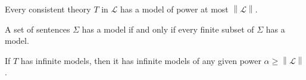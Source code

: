 \documentclass[../../main.tex]{subfiles}
\begin{document}
\begin{theorem}\label{down-lowenheim-skolem}\cite[Corollary 2.1.4]{Cha90}
    Every consistent theory $T$ in $\mathcal{L}$ has a model of power at most $\left\lVert \mathcal{L} \right\rVert$.
\end{theorem}

\begin{theorem}\cite[Theorem 1.3.22]{Cha90}
    A set of sentences $\Sigma$ has a model if and only if every finite subset of $\Sigma$ has a model.
\end{theorem}

\begin{theorem}\label{up-lowenheim-skolem}\cite[Corollary 2.1.6]{Cha90}
    If $T$ has infinite models, then it has infinite models of any given power $\alpha \geq \left\lVert \mathcal{L} \right\rVert$.
\end{theorem}
\end{document}
